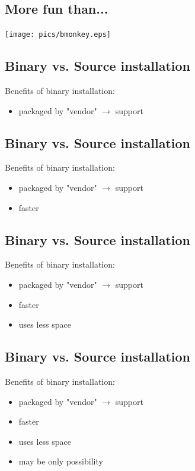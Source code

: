\documentclass[xga]{xdvislides}
\begin{document}
\subsection{More fun than...}
\vspace*{\fill}
\begin{center}
	\texttt{[image: pics/bmonkey.eps]}
\end{center}

\subsection{Binary vs. Source installation}
Benefits of binary installation:
\begin{itemize}
	\item packaged by "vendor" $\rightarrow$ support
\end{itemize}

\subsection{Binary vs. Source installation}
Benefits of binary installation:
\begin{itemize}
	\item packaged by "vendor" $\rightarrow$ support
	\item faster
\end{itemize}

\subsection{Binary vs. Source installation}
Benefits of binary installation:
\begin{itemize}
	\item packaged by "vendor" $\rightarrow$ support
	\item faster
	\item uses less space
\end{itemize}

\subsection{Binary vs. Source installation}
Benefits of binary installation:
\begin{itemize}
	\item packaged by "vendor" $\rightarrow$ support
	\item faster
	\item uses less space
	\item may be only possibility
\end{itemize}
\end{document}
